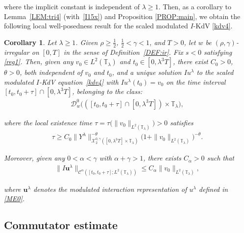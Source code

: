 \documentclass[letterpaper, 11pt,  reqno]{amsart}
\newtheorem{corollary}[theorem]{Corollary}
\newcommand{\1}{\hspace{0.5mm}\text{I}\hspace{0.5mm}}
\newcommand{\noi}{\noindent}
\newcommand{\T}{\mathbb{T}}
\newcommand{\CC}{\mathcal{C}}
\newcommand{\al}{\alpha}
\newcommand{\g}{\gamma}
\newcommand{\ld}{\lambda}
\newcommand{\ta}{\theta}
\newcommand{\cX}{\mathcal{X}}
\newcommand{\cD}{\mathscr{D}}
\newcommand{\uu}{\mathbf{u}}
\numberwithin{equation}{section}
\numberwithin{theorem}{section}
\begin{document}
\noi
where the implicit constant is independent of $\ld \ge 1$.
Then, 
as a corollary to Lemma~\ref{LEM:tri4} (with~\eqref{I15x})
and Proposition \ref{PROP:main}, 
we obtain the following local well-posedness
result for the scaled modulated $I$-KdV \eqref{kdv4}.


\begin{corollary}
\label{COR:I2}
Let $\ld \ge 1$.
Given $\rho \ge\frac 12$,  $\frac 12 < \g < 1$, and $T> 0$, 
let  $w$ be $(\rho,\g)$-irregular
on $[0, T]$ 
 in the sense of Definition~\ref{DEF:ir}.
Fix  $s < 0$ satisfying \eqref{reg1}.
Then, given any 
$v_0 \in L^2(\T_\ld)$ and  $t_0 \in [0, \ld^3 T]$, 
there exist $C_0 > 0$, $\ta > 0$, both independent of $v_0$ and $t_0$, 
and a unique solution $Iu^\ld$
to 
the scaled modulated $I$-KdV equation~\eqref{kdv4} 
with $I u^\ld (t_0)= v_0$
on the time interval $[t_0, t_0 + \tau]\cap [0, \ld^3 T]$,  
belonging to the class\textup{:}
\begin{align*}
 \cD_{w}^0\big( ([t_0, t_0 + \tau] \cap [0, \ld^3 T]) \times \T_\ld\big), 
\end{align*}


\noi
where the local existence time 
$\tau = \tau \big(\| v_0 \|_{L^2(\T_\ld)}\big)> 0$ satisfies
\begin{align}
\tau  \ge C_0 \|Y^\ld\|_{\cX^{0,\g}_2([0, \ld^3 T]\times \T_\ld)}^{-\ta} \big( 1 + \| v_0 \|_{L^2(\T_\ld)}\big)^{-\ta}.
\label{ME0a}
\end{align}

\noi
Moreover, given any $0 < \al < \g$
with $\al + \g > 1$, 
there exists $C_\al > 0$ such that 
\begin{align*}
 \| I\uu^\ld \|_{\CC^\al ([t_0, t_0 + \tau];L^2(\T_\ld))}\le C_\al 
 \|v_0\|_{L^2(\T_\ld)}, 
\end{align*}

\noi
where $\uu^\ld$ denotes the modulated interaction representation of $u^\ld$
defined in  \eqref{ME0}.




\end{corollary}









\subsection{Commutator estimate}
\label{SUBSEC:I3}
\end{document}
